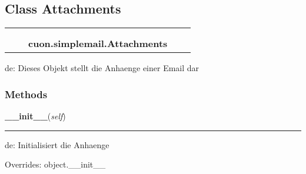 

\subsection{Class Attachments}

    \label{cuon:simplemail:Attachments}
\begin{tabular}{cccccc}
\multicolumn{2}{r}{\settowidth{\BCL}{object}\multirow{2}{\BCL}{object}}
&&
  \\\cline{3-3}
  &&\multicolumn{1}{c|}{}
&&
  \\
&&\multicolumn{2}{l}{\textbf{cuon.simplemail.Attachments}}
\end{tabular}

de: Dieses Objekt stellt die Anhaenge einer Email dar



  \subsubsection{Methods}

    \vspace{0.5ex}

\hspace{.8\funcindent}\begin{boxedminipage}{\funcwidth}

    \raggedright \textbf{\_\_init\_\_}(\textit{self})

    \vspace{-1.5ex}

    \rule{\textwidth}{0.5\fboxrule}
\setlength{\parskip}{2ex}
    de: Initialisiert die Anhaenge

\setlength{\parskip}{1ex}
      Overrides: object.\_\_init\_\_

    \end{boxedminipage}

